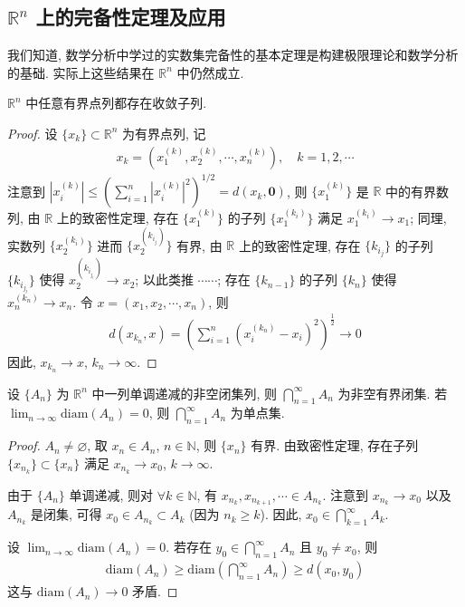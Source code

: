 \documentclass[../../main.tex]{subfiles}
\begin{document}
\subsection{$\mathbb{R}^n$ 上的完备性定理及应用}

我们知道, 数学分析中学过的实数集完备性的基本定理是构建极限理论和数学分析的基础. 实际上这些结果在 $\mathbb{R}^n$ 中仍然成立.

\begin{theorem}[致密性定理]\label{theorem:致密性定理}
$\mathbb{R}^n$ 中任意有界点列都存在收敛子列.
\end{theorem}
\begin{proof}
设 $\{x_k\} \subset \mathbb{R}^n$ 为有界点列, 记
\begin{align*}
x_k = (x_1^{(k)}, x_2^{(k)}, \cdots, x_n^{(k)}), \quad k = 1, 2, \cdots
\end{align*}
注意到 $|x_i^{(k)}| \leqslant \left(\sum_{i = 1}^{n}|x_i^{(k)}|^2\right)^{1/2} = d(x_k, \mathbf{0})$, 则 $\{x_1^{(k)}\}$ 是 $\mathbb{R}$ 中的有界数列, 由 $\mathbb{R}$ 上的致密性定理, 存在 $\{x_1^{(k)}\}$ 的子列 $\{x_1^{(k_i)}\}$ 满足 $x_1^{(k_i)} \to x_1$; 同理, 实数列 $\{x_2^{(k_i)}\}$ 进而 $\{x_2^{(k_{i_j})}\}$ 有界, 由 $\mathbb{R}$ 上的致密性定理, 存在 $\{k_{i_j}\}$ 的子列 $\{k_{i_{j_l}}\}$ 使得 $x_2^{(k_{i_{j_l}})} \to x_2$; 以此类推 $\cdots\cdots$; 存在 $\{k_{n - 1}\}$ 的子列 $\{k_n\}$ 使得 $x_n^{(k_n)} \to x_n$. 令 $x = (x_1, x_2, \cdots, x_n)$, 则
\begin{align*}
d(x_{k_n}, x) = \left(\sum_{i = 1}^{n}(x_i^{(k_n)} - x_i)^2\right)^{\frac{1}{2}} \to 0
\end{align*}
因此, $x_{k_n} \to x$, $k_n \to \infty$.
\end{proof}

\begin{theorem}[闭集套定理]\label{theorem:闭集套定理}
设 $\{A_n\}$ 为 $\mathbb{R}^n$ 中一列单调递减的非空闭集列, 则 $\bigcap_{n = 1}^{\infty} A_n$ 为非空有界闭集. 若 $\lim_{n \to \infty} \mathrm{diam}(A_n) = 0$, 则 $\bigcap_{n = 1}^{\infty} A_n$ 为单点集.
\end{theorem}
\begin{proof}
$A_n \neq \varnothing$, 取 $x_n \in A_n$, $n \in \mathbb{N}$, 则 $\{x_n\}$ 有界. 由致密性定理, 存在子列 $\{x_{n_k}\} \subset \{x_n\}$ 满足 $x_{n_k} \to x_0$, $k \to \infty$.

由于 $\{A_n\}$ 单调递减, 则对 $\forall k \in \mathbb{N}$, 有 $x_{n_k}, x_{n_{k + 1}}, \cdots \in A_{n_k}$. 注意到 $x_{n_k} \to x_0$ 以及 $A_{n_k}$ 是闭集, 可得 $x_0 \in A_{n_k} \subset A_k$ (因为 $n_k \geqslant k$). 因此, $x_0 \in \bigcap_{k = 1}^{\infty} A_k$.

设 $\lim_{n \to \infty} \mathrm{diam}(A_n) = 0$. 若存在 $y_0 \in \bigcap_{n = 1}^{\infty} A_n$ 且 $y_0 \neq x_0$, 则
\begin{align*}
\mathrm{diam}(A_n) \geqslant \mathrm{diam}\left(\bigcap_{n = 1}^{\infty} A_n\right) \geqslant d(x_0, y_0)
\end{align*}
这与 $\mathrm{diam}(A_n) \to 0$ 矛盾. 
\end{proof}
\end{document}
